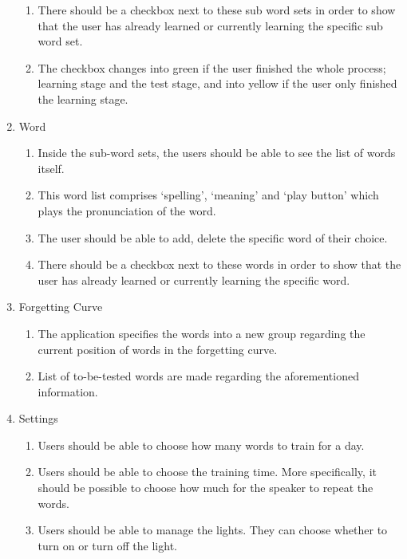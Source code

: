 \documentclass[conference]{IEEEtran}
\begin{document}
\begin{enumerate}
\begin{enumerate}
    \item There should be a checkbox next to these sub word sets in order to show that the user has already learned or currently learning the specific sub word set.
    \item The checkbox changes into green if the user finished the whole process; learning stage and the test stage, and into yellow if the user only finished the learning stage.
    \end{enumerate}
\item Word
    \begin{enumerate}
    \item Inside the sub-word sets, the users should be able to see the list of words itself.
    \item This word list comprises ‘spelling’, ‘meaning’ and ‘play button’ which plays the pronunciation of the word. 
    \item The user should be able to add, delete the specific word of their choice.
    \item There should be a checkbox next to these words in order to show that the user has already learned or currently learning the specific word.
    \end{enumerate}
\item Forgetting Curve
    \begin{enumerate}
    \item The application specifies the words into a new group regarding the current position of words in the forgetting curve.
    \item List of to-be-tested words are made regarding the aforementioned information. 
    \end{enumerate}
\item Settings
    \begin{enumerate}
    \item Users should be able to choose how many words to train for a day.
    \item Users should be able to choose the training time. More specifically, it should be possible to choose how much for the speaker to repeat the words.
    \item Users should be able to manage the lights. They can choose whether to turn on or turn off the light. 
    \end{enumerate}
\end{enumerate}
\end{document}
